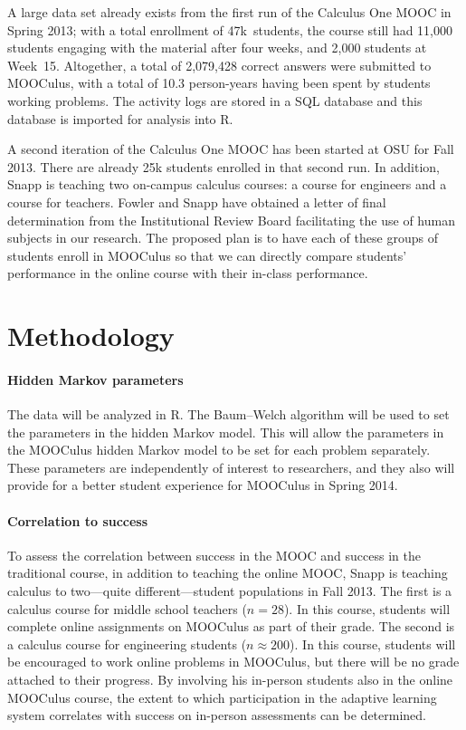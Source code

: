 \documentclass[12pt]{article}
\begin{document}
A large data set already exists from the first run of the Calculus One
MOOC in Spring 2013; with a total enrollment of 47k~students, the
course still had 11,000 students engaging with the material after four
weeks, and 2,000 students at Week~15.  Altogether, a total of
2,079,428 correct answers were submitted to MOOCulus, with a total of
10.3 person-years having been spent by students working problems.  The
activity logs are stored in a SQL database and this database is
imported for analysis into R.

A second iteration of the Calculus One MOOC has been started at OSU
for Fall 2013.  There are already 25k students enrolled in that second
run.  In addition, Snapp is teaching two on-campus calculus courses: a
course for engineers and a course for teachers.  Fowler and Snapp have
obtained a letter of final determination from the Institutional Review
Board facilitating the use of human subjects in our research.  The
proposed plan is to have each of these groups of students enroll in
MOOCulus so that we can directly compare students' performance in the
online course with their in-class performance.

\section{Methodology}

\paragraph{Hidden Markov parameters}

The data will be analyzed in R.  The Baum--Welch algorithm will be used
to set the parameters in the hidden Markov model. This will allow the
parameters in the MOOCulus hidden Markov model to be set for each
problem separately.  These parameters are independently of interest to
researchers, and they also will provide for a better student
experience for MOOCulus in Spring 2014.

\paragraph{Correlation to success}

To assess the correlation between success in the MOOC and success in
the traditional course, in addition to teaching the online MOOC, Snapp
is teaching calculus to two---quite different---student populations in
Fall 2013.  The first is a calculus course for middle school teachers
($n=28$). In this course, students will complete online assignments on
MOOCulus as part of their grade.  The second is a calculus course for
engineering students ($n\approx 200$).  In this course, students will
be encouraged to work online problems in MOOCulus, but there will be
no grade attached to their progress.  By involving his in-person
students also in the online MOOCulus course, the extent to which
participation in the adaptive learning system correlates with success
on in-person assessments can be determined.
\end{document}
